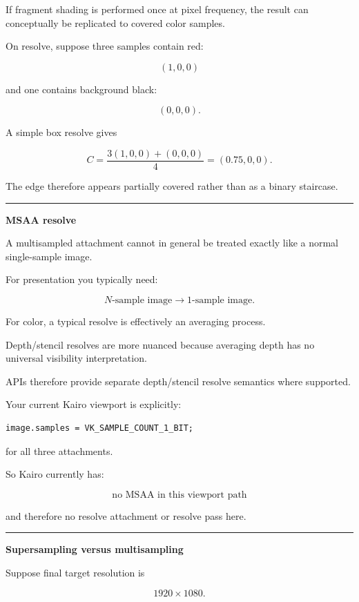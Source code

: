 If fragment shading is performed once at pixel frequency, the result can conceptually be replicated to covered color samples.

On resolve, suppose three samples contain red:

\[
(1,0,0)
\]

and one contains background black:

\[
(0,0,0).
\]

A simple box resolve gives

\[
C=
\frac{3(1,0,0)+(0,0,0)}4
=
(0.75,0,0).
\]

The edge therefore appears partially covered rather than as a binary staircase.

\begin{center}\rule{0.5\linewidth}{0.5pt}\end{center}

\textbf{MSAA resolve}

A multisampled attachment cannot in general be treated exactly like a normal single-sample image.

For presentation you typically need:

\[
N\text{-sample image}
\rightarrow
1\text{-sample image}.
\]

For color, a typical resolve is effectively an averaging process.

Depth/stencil resolves are more nuanced because averaging depth has no universal visibility interpretation.

APIs therefore provide separate depth/stencil resolve semantics where supported.

Your current Kairo viewport is explicitly:

\begin{verbatim}
image.samples = VK_SAMPLE_COUNT_1_BIT;
\end{verbatim}

for all three attachments.

So Kairo currently has:

\[
\boxed{\text{no MSAA in this viewport path}}
\]

and therefore no resolve attachment or resolve pass here.

\begin{center}\rule{0.5\linewidth}{0.5pt}\end{center}

\textbf{Supersampling versus multisampling}

Suppose final target resolution is

\[
1920\times1080.
\]

